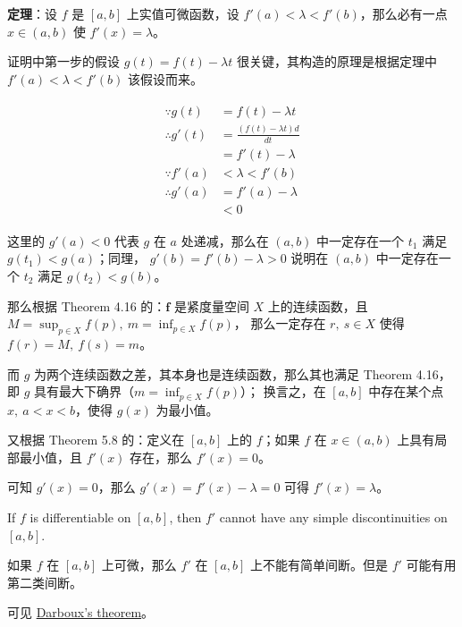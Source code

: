 \documentclass[../poma-notes.tex]{subfiles}
\begin{document}
\begin{anote}
  \textbf{定理}：设 $f$ 是 $[a, b]$ 上实值可微函数，设 $f'(a) < \lambda < f'(b)$，那么必有一点 $x \in (a, b)$ 使 $f'(x) = \lambda$。

  证明中第一步的假设 $g(t) = f(t) - \lambda t$ 很关键，其构造的原理是根据定理中 $f'(a) < \lambda < f'(b)$ 该假设而来。

  \begin{align*}
    \begin{split}
      \because g(t) &= f(t) - \lambda t \\
      \therefore g'(t) &= \frac{(f(t) - \lambda t) d}{d t} \\
      &= f'(t) - \lambda \\
      \because f'(a) &< \lambda < f'(b) \\
      \therefore g'(a) &= f'(a) - \lambda \\
      & < 0
    \end{split}
  \end{align*}

  这里的 $g'(a) < 0$ 代表 $g$ 在 $a$ 处递减，那么在 $(a, b)$ 中一定存在一个 $t_1$ 满足 $g(t_1) < g(a)$；同理，
  $g'(b) = f'(b) - \lambda > 0$ 说明在 $(a, b)$ 中一定存在一个 $t_2$ 满足 $g(t_2) < g(b)$。

  那么根据 Theorem 4.16 的：$\mathbf{f}$ 是紧度量空间 $X$ 上的连续函数，且 $M = \sup_{p\in X}f(p),\ m = \inf_{p\in X}f(p)$，
  那么一定存在 $r,\ s \in X$ 使得 $f(r) = M,\ f(s) = m$。

  而 $g$ 为两个连续函数之差，其本身也是连续函数，那么其也满足 Theorem 4.16，即 $g$ 具有最大下确界（$m = \inf_{p\in X}f(p)$）；
  换言之，在 $[a, b]$ 中存在某个点 $x,\ a < x < b$，使得 $g(x)$ 为最小值。

  又根据 Theorem 5.8 的：定义在 $[a,b]$ 上的 $f$；如果 $f$ 在 $x \in (a,b)$ 上具有局部最小值，且 $f'(x)$ 存在，那么 $f'(x)=0$。

  可知 $g'(x) = 0$，那么 $g'(x) = f'(x) - \lambda = 0$ 可得 $f'(x) = \lambda$。
\end{anote}

\begin{corollary}
  If $f$ is differentiable on $[a, b]$, then $f'$ cannot have any simple discontinuities on $[a, b]$.
\end{corollary}

\begin{anote}
  如果 $f$ 在 $[a, b]$ 上可微，那么 $f'$ 在 $[a, b]$ 上不能有简单间断。但是 $f'$ 可能有用第二类间断。

  可见 \href{https://en.wikipedia.org/wiki/Darboux%27s_theorem_(analysis)}{Darboux's theorem}。
\end{anote}
\end{document}
